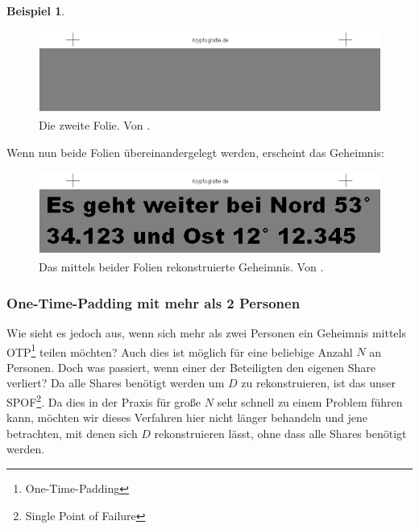 \documentclass[12pt, a4paper, oneside, titlepage]{report}
\theoremstyle{definition}
\newtheorem{bsp}[lemma]{Beispiel}
\begin{document}
\begin{bsp}
		\begin{figure}[H]
			\centering
			\includegraphics[width=1.\textwidth]{images/visual3.png}
			\caption{Die zweite Folie. Von \cite{visual}.}
			\label{sheet2}
		\end{figure}
	
		Wenn nun beide Folien übereinandergelegt werden, erscheint das Geheimnis:
		
		\begin{figure}[H]
			\centering
			\includegraphics[width=1.\textwidth]{images/visual4.png}
			\caption{Das mittels beider Folien rekonstruierte Geheimnis. Von \cite{visual}.}
			\label{secret-image}
		\end{figure}
	\end{bsp}
	
	\subsubsection{One-Time-Padding mit mehr als 2 Personen}
	Wie sieht es jedoch aus, wenn sich mehr als zwei Personen ein Geheimnis mittels OTP\footnote{One-Time-Padding} teilen möchten? Auch dies ist möglich für eine beliebige Anzahl $ N $ an Personen. Doch was passiert, wenn einer der Beteiligten den eigenen Share verliert? Da alle Shares benötigt werden um $ D $ zu rekonstruieren, ist das unser SPOF\footnote{Single Point of Failure}. Da dies in der Praxis für große $ N $ sehr schnell zu einem Problem führen kann, möchten wir dieses Verfahren hier nicht länger behandeln und jene betrachten, mit denen sich $ D $ rekonstruieren lässt, ohne dass alle Shares benötigt werden.
	
	\pagebreak %
	
\end{document}
